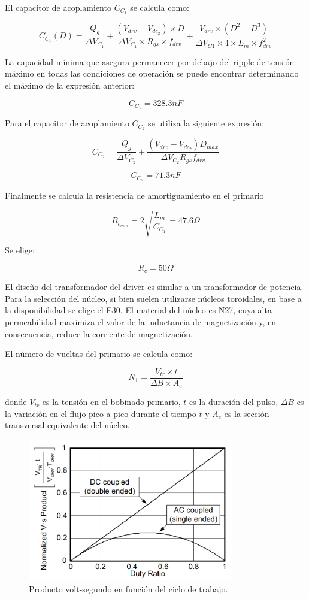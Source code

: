 El capacitor de acoplamiento $C_{C_1}$ se calcula como:

$$ C_{C_1}(D)=\frac{Q_g}{\Delta V_{C_1}}+\frac{(V_{drv}-V_{{dc}_2})\times D}{\Delta V_{C_1}\times R_{gs}\times f_{drv}}+\frac{V_{drv}\times (D^2-D^3)}{\Delta V_{C1}\times 4\times L_m\times f_{drv}^2} $$

La capacidad mínima que asegura permanecer por debajo del ripple de tensión máximo en todas las condiciones de operación 
se puede encontrar determinando el máximo de la expresión anterior:

$$ C_{C_1}=328.3nF $$

Para el capacitor de acoplamiento $C_{C_2}$ se utiliza la siguiente expresión:

$$ C_{C_2}=\frac{Q_g}{\Delta V_{C_2}}+\frac{(V_{drv}-V_{dc_2})D_{max}}{\Delta V_{C_2}R_{gs}f_{drv}} $$

$$ C_{C_2}=71.3nF $$

Finalmente se calcula la resistencia de amortiguamiento en el primario

$$ R_{c_{min}}=2\sqrt{\frac{L_m}{C_{C_1}}}=47.6\Omega $$

Se elige:

$$ R_c=50\Omega $$

El diseño del transformador del driver es similar a un transformador de potencia. 
Para la selección del núcleo, si bien suelen utilizarse núcleos toroidales, en base a la disponibilidad se elige el E30. 
El material del núcleo es N27, cuya alta permeabilidad maximiza el valor de 
la inductancia de magnetización y, en consecuencia, reduce la corriente de magnetización.

El número de vueltas del primario se calcula como: 

$$ N_{1}=\frac {V_{tr}\times t}{\Delta B \times A_{e}} $$

donde $V_{tr}$ es la tensión en el bobinado primario, $t$ es la duración del pulso, 
$\Delta B$ es la variación en el flujo pico a pico durante el tiempo $t$ y $A_{e}$ es la sección transversal equivalente del núcleo. 

\begin{figure}[H]
    \centering
    \includegraphics[width=0.8\textwidth]{images/VS-product-vs-duty-ratio.png}
    \caption{Producto volt-segundo en función del ciclo de trabajo.}
    \label{fig:producto-vs}
\end{figure}

